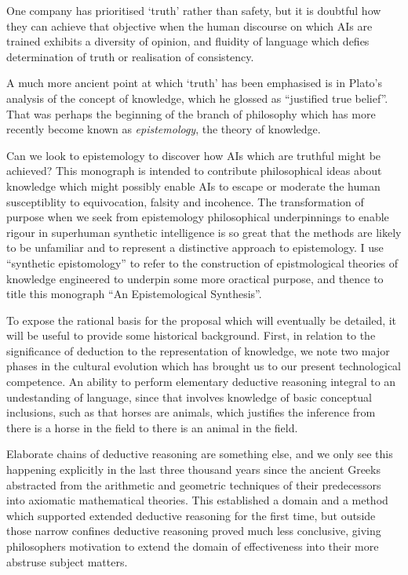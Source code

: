 \documentclass[10pt,titlepage]{book}
\begin{document}
One company has prioritised `truth' rather than safety, but it is doubtful how they can achieve that objective when the human discourse on which AIs are trained exhibits a diversity of opinion, and fluidity of language which defies determination of truth or realisation of consistency.

A much more ancient point at which `truth' has been emphasised is in Plato's analysis of the concept of knowledge, which he glossed as ``justified true belief''.
That was perhaps the beginning of the branch of philosophy which has more recently become known as \emph{epistemology}, the theory of knowledge.

Can we look to epistemology to discover how AIs which are truthful might be achieved?
This monograph is intended to contribute philosophical ideas about knowledge which might possibly enable AIs to escape or moderate the human susceptiblity to equivocation, falsity and incohence.
The transformation of purpose when we seek from epistemology philosophical underpinnings to enable rigour in superhuman synthetic intelligence is so great that the methods are likely to be unfamiliar and to represent a distinctive approach to epistemology.
I use ``synthetic epistomology'' to refer to the construction of epistmological theories of knowledge engineered to underpin some more oractical purpose, and thence to title this monograph ``An Epistemological Synthesis''.

To expose the rational basis for the proposal which will eventually be detailed, it will be useful to provide some historical background.
First, in relation to the significance of deduction to the representation of knowledge, we note two major phases in the cultural evolution which has brought us to our present technological competence.
An ability to perform elementary deductive reasoning integral to an undestanding of language, since that involves knowledge of basic conceptual inclusions, such as that horses are animals, which justifies the inference from there is a horse in the field to there is an animal in the field.

Elaborate chains of deductive reasoning are something else, and we only see this happening explicitly in the last three thousand years since the ancient Greeks abstracted from the arithmetic and geometric techniques of their predecessors into axiomatic mathematical theories.
This established a domain and a method which supported extended deductive reasoning for the first time, but outside those narrow confines deductive reasoning proved much less conclusive, giving philosophers motivation to extend the domain of effectiveness into their more abstruse subject matters.
\end{document}
